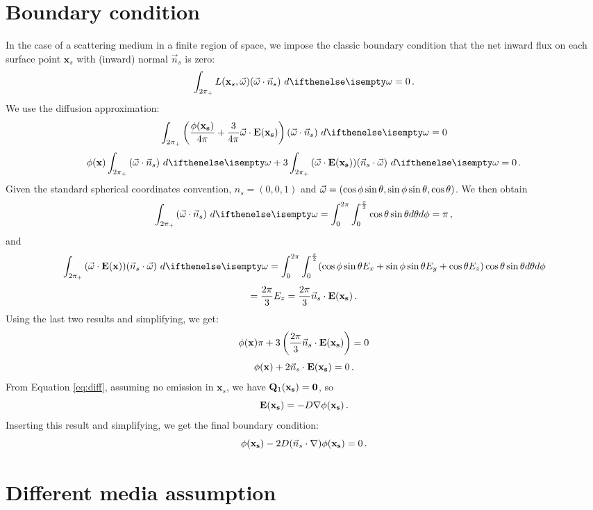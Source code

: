 \documentclass[10pt,a4paper]{article}
\begin{document}
\section{Boundary condition}

In the case of a scattering medium in a finite region of space, we impose the classic boundary condition that the net inward flux on each surface point $\mathbf{x}_s$ with (inward) normal $\vec{n}_s$ is zero:
$$
\hemisphere{L(\mathbf{x}_s, \omegavec) (\omegavec \cdot \vec{n}_s)}{} = 0 \, .
$$
We use the diffusion approximation:
$$
\hemisphere{\left(\frac{\func{\phi}{\mathbf{x}_s}}{4\pi} + \frac{3}{4\pi} \omegavec \cdot \vecfunc{E}{\mathbf{x}_s}\right) (\omegavec \cdot \vec{n}_s)}{} = 0
$$
$$
\xfunc{\phi} \hemisphere{ (\omegavec \cdot \vec{n}_s)}{} + 3  \hemisphere{(\omegavec \cdot \vecfunc{E}{\mathbf{x}_s}) (\vec{n}_s \cdot \omegavec) }{} = 0 \, .
$$
Given the standard spherical coordinates convention, $n_s = (0,0,1)$ and $\vec{\omega} = (\cos\phi\sin\theta,\sin\phi\sin\theta,\cos\theta)$. We then obtain
$$
\hemisphere{ (\omegavec \cdot \vec{n}_s)}{} = \int_{0}^{2\pi} \int_{0}^{\frac{\pi}{2}} \cos\theta \sin\theta d\theta d\phi = \pi \, ,
$$
and
$$
\hemisphere{(\omegavec \cdot \xvecfunc{E}) (\vec{n}_s \cdot \omegavec) }{} = \int_{0}^{2\pi} \int_{0}^{\frac{\pi}{2}}(\cos\phi\sin\theta E_x+\sin\phi\sin\theta E_y+\cos\theta E_z) \cos\theta \sin\theta d\theta d\phi
$$
$$
= \frac{2\pi}{3} E_z = \frac{2\pi}{3} \vec{n}_s \cdot \mathbf{E}(\mathbf{\mathbf{x}_s}) \, .
$$
Using the last two results and simplifying, we get:
$$
{\phi}(\mathbf{x}) \pi + 3 \left(\frac{2\pi}{3} \vec{n}_s \cdot \mathbf{E}(\mathbf{\mathbf{x}_s})\right)= 0
$$
$$
{\phi}(\mathbf{x}) + 2 \vec{n}_s \cdot \mathbf{E}(\mathbf{\mathbf{x}_s}) = 0 \, .
$$
From Equation \ref{eq:diff}, assuming no emission in $\mathbf{x}_s$, we have $\mathbf{Q}_1(\mathbf{\mathbf{x}_s}) = \mathbf{0}$, so
$$
\mathbf{E}(\mathbf{\mathbf{x}_s}) = - D{\nabla} {\phi}(\mathbf{\mathbf{x}_s}) \, .
$$
Inserting this result and simplifying, we get the final boundary condition:
$$
{\phi}(\mathbf{\mathbf{x}_s}) - 2 D (\vec{n}_s \cdot {\nabla}) {\phi}(\mathbf{\mathbf{x}_s}) = 0 \, .
$$

\section{Different media assumption}
\end{document}
